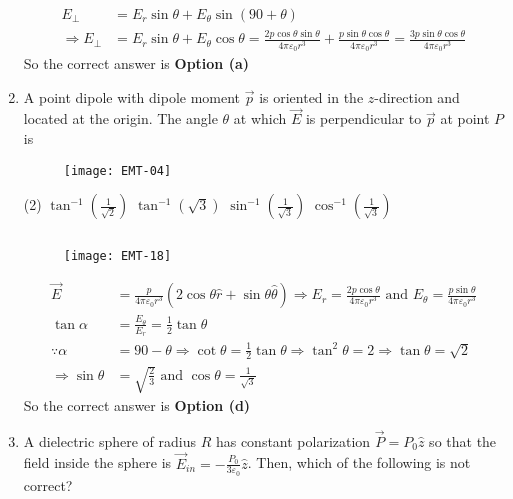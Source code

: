 \begin{enumerate}
\begin{answer}
$$\begin{aligned}
	E_{\perp}&=E_{r} \sin \theta+E_{\theta} \sin (90+\theta)\\
	\Rightarrow E_{\perp}&=E_{r} \sin \theta+E_{\theta} \cos \theta=\frac{2 p \cos \theta \sin \theta}{4 \pi \varepsilon_{0} r^{3}}+\frac{p \sin \theta \cos \theta}{4 \pi \varepsilon_{0} r^{3}}=\frac{3 p \sin \theta \cos \theta}{4 \pi \varepsilon_{0} r^{3}}
\end{aligned}
$$
So the correct answer is \textbf{Option (a)}
\end{answer}
\item  A point dipole with dipole moment $\vec{p}$ is oriented in the $z$-direction and located at the origin.
The angle $\theta$ at which $\vec{E}$ is perpendicular to $\vec{p}$ at point $P$ is
\begin{figure}[H]
	\centering
	\texttt{[image: EMT-04]}
\end{figure}
 \begin{tasks}(2)
	\task[\textbf{a.}]$\tan ^{-1}\left(\frac{1}{\sqrt{2}}\right)$
	\task[\textbf{b.}]$\tan ^{-1}(\sqrt{3})$
	\task[\textbf{c.}]$\sin ^{-1}\left(\frac{1}{\sqrt{3}}\right)$
	\task[\textbf{d.}] $\cos ^{-1}\left(\frac{1}{\sqrt{3}}\right)$	
\end{tasks}	
\begin{answer}$\left. \right. $\\
	\begin{figure}[H]
		\centering
		\texttt{[image: EMT-18]}
	\end{figure}
	$$
	\begin{aligned}
	\vec{E}&=\frac{p}{4 \pi \varepsilon_{0} r^{3}}(2 \cos \theta \hat{r}+\sin \theta \hat{\theta}) \Rightarrow E_{r}=\frac{2 p \cos \theta}{4 \pi \varepsilon_{0} r^{3}} \text { and } E_{\theta}=\frac{p \sin \theta}{4 \pi \varepsilon_{0} r^{3}}\\
	\tan \alpha&=\frac{E_{\theta}}{E_{r}}=\frac{1}{2} \tan \theta\\
	\because \alpha&=90-\theta \Rightarrow \cot \theta=\frac{1}{2} \tan \theta \Rightarrow \tan ^{2} \theta=2 \Rightarrow \tan \theta=\sqrt{2}\\
	\Rightarrow \sin \theta&=\sqrt{\frac{2}{3}} \text { and } \cos \theta=\frac{1}{\sqrt{3}}
\end{aligned}
$$
So the correct answer is \textbf{Option (d)}
\end{answer}
\item  A dielectric sphere of radius $R$ has constant polarization $\vec{P}=P_{0} \hat{z}$ so that the field inside the sphere is $\vec{E}_{i n}=-\frac{P_{0}}{3 \varepsilon_{0}} \hat{z}$. Then, which of the following is not correct?

\end{enumerate}
